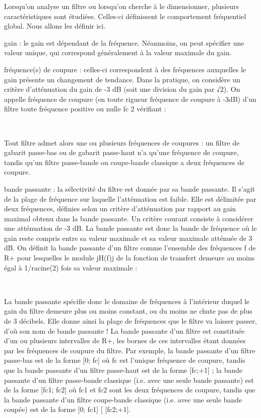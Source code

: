 \documentclass[]{article}
\begin{document}
Lorsqu'on analyse un filtre ou lorsqu'on cherche à le dimensionner,
plusieurs caractéristiques sont étudiées. Celles-ci définissent le
comportement fréquentiel global. Nous allons les définir ici.~

gain : le gain est dépendant de la fréquence. Néanmoins, on peut
spécifier une valeur unique, qui correspond généralement à la valeur
maximale du gain.

fréquence(s) de coupure : celles-ci correspondent à des fréquences
auxquelles le gain présente un changement de tendance. Dans la pratique,
on considère un critère d'atténuation du gain de -3 dB (soit une
division du gain par √2). On appelle fréquence de coupure (en toute
rigueur fréquence de coupure à -3dB) d'un filtre toute fréquence
positive ou nulle fc 2 vérifiant :

~~ ~ ~

Tout filtre admet alors une ou plusieurs fréquences de coupures : un
filtre de gabarit passe-bas ou de gabarit passe-haut n'a qu'une
fréquence de coupure, tandis qu'un filtre passe-bande ou coupe-bande
classique a deux fréquences de coupure.

bande passante : la sélectivité du filtre est donnée par sa bande
passante. Il s'agit de la plage de fréquence sur laquelle l'atténuation
est faible. Elle est délimitée par deux fréquences, définies selon un
critère d'atténuation par rapport au gain maximal obtenu dans la bande
passante. Un critère courant consiste à considérer une atténuation de -3
dB. La bande passante est donc la bande de fréquence où le gain reste
compris entre sa valeur maximale et sa valeur maximale atténuée de 3 dB.
On définit la bande passante d'un filtre comme l'ensemble des fréquences
f de R+ pour lesquelles le module jH(f)j de la fonction de transfert
demeure au moins égal à 1/racine(2) fois sa valeur maximale :

~~ ~

La bande passante spécifie donc le domaine de fréquences à l'intérieur
duquel le gain du filtre demeure plus ou moins constant, ou du moins ne
chute pas de plus de 3 décibels. Elle donne ainsi la plage de fréquences
que le filtre va laisser passer, d'où son nom de bande passante ! La
bande passante d'un filtre est constituée d'un ou plusieurs intervalles
de R+, les bornes de ces intervalles étant données par les fréquences de
coupure du filtre. Par exemple, la bande passante d'un filtre passe-bas
est de la forme {[}0; fc{]} où fc est l'unique fréquence de coupure,
tandis que la bande passante d'un filtre passe-haut est de la forme
{[}fc;+1{]} ; la bande passante d'un filtre passe-bande classique (i.e.
avec une seule bande passante) est de la forme {[}fc1; fc2{]} où fc1 et
fc2 sont les deux fréquences de coupure, tandis que la bande passante
d'un filtre coupe-bande classique (i.e. avec une seule bande coupée) est
de la forme {[}0; fc1{]} {[} {[}fc2;+1{]}.
\end{document}

